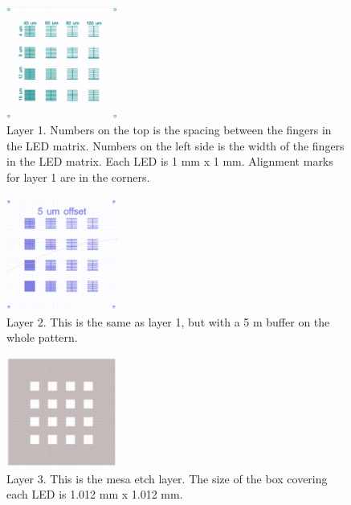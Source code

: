 \begin{figure}[!h]
    \centering
    \includegraphics[width=0.325\textwidth]{figures/CleWin_L1.png}
    \caption{
        Layer 1. 
        Numbers on the top is the spacing between the fingers in the LED matrix.
        Numbers on the left side is the width of the fingers in the LED matrix.
        Each LED is 1 mm x 1 mm. 
        Alignment marks for layer 1 are in the corners. 
    }
    \label{fig:CleWin_L1}
\end{figure}


\begin{figure}[!h]
    \centering
    \includegraphics[width=0.325\textwidth]{figures/CleWin_L2.png}
    \caption{
        Layer 2. 
        This is the same as layer 1, but with a 5 \textmu m buffer on the whole pattern. 
    }
    \label{fig:CleWin_L2}
\end{figure}


\begin{figure}[!h]
    \centering
    \includegraphics[width=0.325\textwidth]{figures/CleWin_L3.png}
    \caption{
        Layer 3. 
        This is the mesa etch layer. 
        The size of the box covering each LED is 1.012 mm x 1.012 mm.
    }
    \label{fig:CleWin_L3}
\end{figure}

